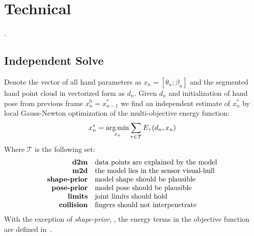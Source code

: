 \section{Technical}

.


\subsection{Independent Solve}
\label{sec:independent}
% 
Denote the vector of all hand parameters as $x_n = [\theta_n; \beta_n]$ and the segmented hand point cloud in vectorized form as $d_n$. Given $d_n$ and initialization of hand pose from previous frame $x_n^0 = x_{n - 1}^*$ we find an independent estimate of $x_n^*$ by local Gauss-Newton optimization of the multi-objective energy function:
% 
\begin{equation}
x_n^* = \operatorname*{arg\,min}_{x_n} \sum_{\tau \in \mathcal{T}} E_{\tau}(d_n, x_n) \label{eq:energies}
\end{equation}
% 
Where $\mathcal{T}$ is the following set:
%
\vspace{-.5\parskip}
\begin{equation*}
\setlength{\jot}{0pt}
\begin{aligned}
\text{\textbf{d2m}} & \quad \text{data points are explained by the model} \\ 
\text{\textbf{m2d}} & \quad \text{the model lies in the sensor visual-hull} \\
\text{\textbf{shape-prior}} & \quad \text{model shape should be plausible} \\
\text{\textbf{pose-prior}} & \quad \text{model pose should be plausible} \\
\text{\textbf{limits}} & \quad \text{joint limits should hold} \\
\text{\textbf{collision}} & \quad \text{fingers should not interpenetrate} 
\end{aligned}
\end{equation*}
With the exception of \emph{shape-prior}, , the energy terms in the objective function are defined in~\cite{tkach2016sphere}.

